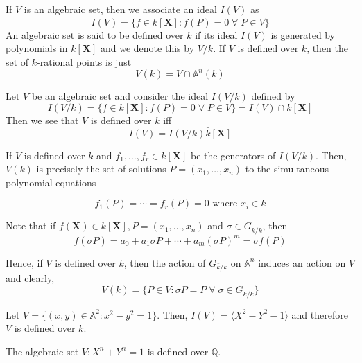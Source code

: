 \documentclass[oneside, 12pt]{scrbook}
\newcommand{\QQ}{\mathbb Q}
\newcommand{\Aa}{\mathbb{A}}
\theoremstyle{theorem}
\begin{document}
\begin{definition}
If $V$ is an algebraic set, then we associate an ideal $I(V)$ as 
\begin{equation}
I(V) = \{f \in \bar{k}[\mathbf{X}]: f(P)=0 \; \forall \; P \in V\}
\end{equation}
An algebraic set is said to be defined over $k$ if its ideal $I(V)$ is generated by polynomials in $k[\mathbf{X}]$ and we denote this by $V/k$. If $V$ is defined over $k$, then the set of $k$-rational points is just $$V(k) = V \cap \Aa^n (k)$$
\end{definition}

\begin{remark}
Let $V$ be an algebraic set and consider the ideal $I(V/k)$ defined by 
\begin{equation}
I(V/k) = \{f \in k [\mathbf{X}]: f(P)=0 \; \forall\; P \in V\} = I(V) \cap k[\mathbf{X}]
\end{equation}
Then we see that $V$ is defined over $k$ iff $$I(V) = I(V/k)\bar{k}[\mathbf{X}]$$ 
\end{remark}

If $V$ is defined over $k$ and $f_{1}, \hdots , f_{r} \in k[\mathbf{X}]$ be the generators of $I(V/k)$. Then, $V(k)$ is precisely the set of solutions $P=(x_{1}, \hdots , x_{n})$ to the simultaneous polynomial equations 

\begin{equation}
f_{1}(P) = \cdots = f_{r}(P)=0 \text{ where } x_{i} \in k
\end{equation}

Note that if $f(\mathbf{X}) \in k[\mathbf{X}] , P =(x_{1}, \hdots , x_{n})$ and $\sigma \in G_{\bar{k}/k}$, then 
\begin{equation}
f(\sigma P) = a_{0} + a_{1} \sigma P + \cdots + a_{m} (\sigma P)^m = \sigma f(P)
\end{equation}

Hence, if $V$ is defined over $k$, then the action of $G_{\bar{k}/k}$ on $\Aa^n$ induces an action on $V$ and clearly, 
\begin{equation}
V(k) = \{P \in V : \sigma P = P \; \forall \; \sigma \in G_{\bar{k}/k}\}
\end{equation}

\begin{example}
Let $V= \{(x,y)\in \Aa^2 : x^2 -y^2=1\}$. Then, $I(V) = \langle X^2 - Y^2 -1 \rangle$ and therefore $V$ is defined over $k$. 
\end{example}

\begin{example}
The algebraic set $V: X^n + Y^n =1$ is defined over $\QQ$.
\end{example}
\end{document}
